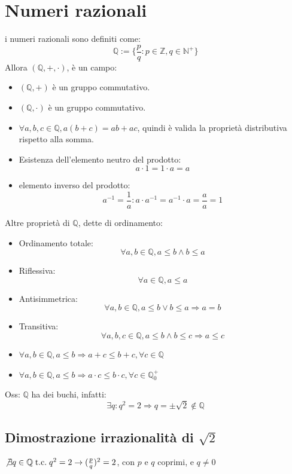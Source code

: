 \documentclass[a4paper, 12pt, openany]{book}
\begin{document}
	\section{Numeri razionali}
	i numeri razionali sono definiti come:
	\[\mathbb{Q} := \{\frac{p}{q} : p \in \mathbb{Z}, q \in \mathbb{N}^+\}\]
	Allora $(\mathbb{Q}, +, \cdot)$, è un campo:
	\begin{itemize}
		\item $(\mathbb{Q}, +)$ è un gruppo commutativo.
		\item $(\mathbb{Q}, \cdot)$ è un gruppo commutativo.
		\item $\forall a,b,c \in \mathbb{Q}, a(b+c) = ab + ac$, quindi è valida la proprietà distributiva rispetto alla somma.
		\item Esistenza dell'elemento neutro del prodotto:
		\[a \cdot 1 = 1 \cdot a = a\]
		\item elemento inverso del prodotto:
		\[a^{-1} = \frac{1}{a}: a \cdot a^{-1} = a^{-1} \cdot a = \frac{a}{a} = 1\]
	\end{itemize}
	Altre proprietà di $\mathbb{Q}$, dette di ordinamento:
	\begin{itemize}
		\item Ordinamento totale: 
		\[\forall a,b \in \mathbb{Q}, a \leq b \wedge b \leq a\]
		\item Riflessiva:
		\[\forall a \in \mathbb{Q}, a \leq a\]
		\item Antisimmetrica:
		\[\forall a, b \in \mathbb{Q}, a \leq b \vee b\leq a \Rightarrow a = b\]
		\item Transitiva:
		\[\forall a,b,c \in \mathbb{Q}, a \leq b \wedge b \leq c \Rightarrow a \leq c\]
		\item $\forall a,b \in \mathbb{Q}, a \leq b \Rightarrow a+ c \leq b +c, \forall c \in \mathbb{Q}$
		\item $\forall a,b \in \mathbb{Q}, a \leq b \Rightarrow a \cdot c \leq b \cdot c, \forall c \in \mathbb{Q}_0^+$
	\end{itemize}
	
	Oss: $\mathbb{Q}$ ha dei buchi, infatti:
	\[\exists q : q^2 = 2 \Rightarrow q = \pm \sqrt{2} \not \in \mathbb{Q}\]
	
	\subsection{Dimostrazione irrazionalità di $\sqrt{2}$}
	\begin{proposition}
		$\not \exists q \in \mathbb{Q} \;\text{t.c.}\; q^2 = 2 \rightarrow (\frac{p}{q})^2 = 2$, con $p$ e $q$ coprimi, e $q \not = 0$
	\end{proposition}
	
\end{document}
